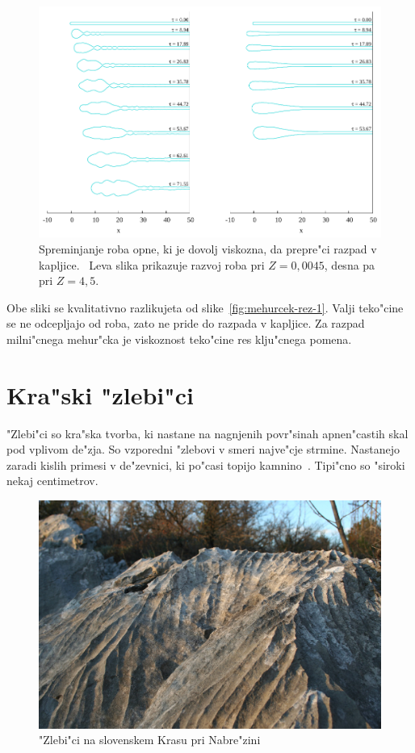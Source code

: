 \documentclass[a4paper,12pt]{article}
\begin{document}
\begin{figure}[h]
  \centering
\includegraphics[width=.9\textwidth]{./Slike/scat-rezultat-1}
\caption{Spreminjanje roba opne, ki je dovolj viskozna, da prepre"ci razpad v kapljice.~\cite{scat}
Leva slika prikazuje razvoj roba pri $Z=0,0045$, desna pa pri $Z=4,5$. }
\label{fig:mehurcek-rez-vis-1}
\end{figure}

Obe sliki se kvalitativno razlikujeta od slike~\ref{fig:mehurcek-rez-1}. Valji teko"cine se ne odcepljajo od roba, zato ne pride do razpada v kapljice. Za razpad milni"cnega mehur"cka je viskoznost teko"cine res klju"cnega pomena. 

\section{Kra"ski "zlebi"ci}

"Zlebi"ci so kra"ska tvorba, ki nastane na nagnjenih povr"sinah apnen"castih skal pod vplivom de"zja. So vzporedni "zlebovi v smeri najve"cje strmine. Nastanejo zaradi kislih primesi v de"zevnici, ki po"casi topijo kamnino~\cite{perne,perne-seminar}. Tipi"cno so "siroki nekaj centimetrov. 

\begin{figure}[h]
\centering
 \includegraphics[width=.8\textwidth]{./Slike/Zlebici}
 \caption{"Zlebi"ci na slovenskem Krasu pri Nabre"zini~\cite{wiki:zlebic} }
 \label{fig:zlebici-slika}
\end{figure}
\end{document}
